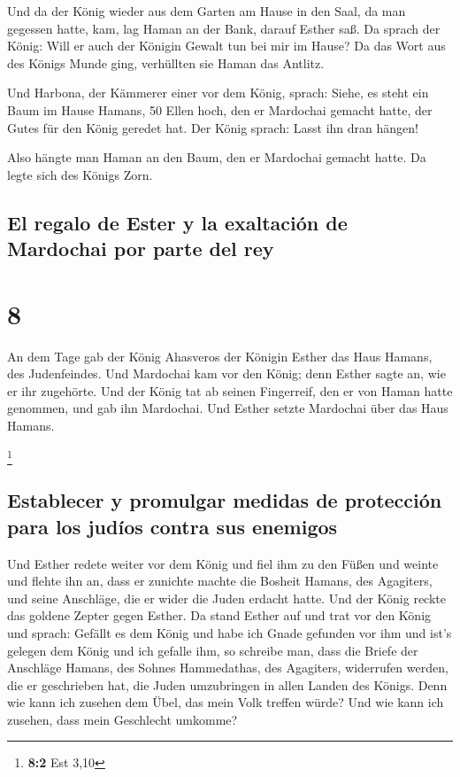  Und da der König wieder aus dem Garten am Hause in den
Saal, da man gegessen hatte, kam, lag Haman an der Bank, darauf Esther
saß. Da sprach der König: Will er auch der Königin Gewalt tun bei mir im
Hause? Da das Wort aus des Königs Munde ging, verhüllten sie Haman das
Antlitz.

 Und Harbona, der Kämmerer einer vor dem König, sprach:
Siehe, es steht ein Baum im Hause Hamans, 50 Ellen hoch, den er
Mardochai gemacht hatte, der Gutes für den König geredet hat. Der König
sprach: Lasst ihn dran hängen!

 Also hängte man Haman an den Baum, den er Mardochai
gemacht hatte. Da legte sich des Königs Zorn.

\hypertarget{el-regalo-de-ester-y-la-exaltaciuxf3n-de-mardochai-por-parte-del-rey}{%
\subsection{El regalo de Ester y la exaltación de Mardochai por parte
del
rey}\label{el-regalo-de-ester-y-la-exaltaciuxf3n-de-mardochai-por-parte-del-rey}}

\hypertarget{section-7}{%
\section{8}\label{section-7}}

 An dem Tage gab der König Ahasveros der Königin Esther
das Haus Hamans, des Judenfeindes. Und Mardochai kam vor den König; denn
Esther sagte an, wie er ihr zugehörte.  Und der König tat
ab seinen Fingerreif, den er von Haman hatte genommen, und gab ihn
Mardochai. Und Esther setzte Mardochai über das Haus Hamans.

\footnote{\textbf{8:2} Est 3,10}

\hypertarget{establecer-y-promulgar-medidas-de-protecciuxf3n-para-los-juduxedos-contra-sus-enemigos}{%
\subsection{Establecer y promulgar medidas de protección para los judíos
contra sus
enemigos}\label{establecer-y-promulgar-medidas-de-protecciuxf3n-para-los-juduxedos-contra-sus-enemigos}}

 Und Esther redete weiter vor dem König und fiel ihm zu
den Füßen und weinte und flehte ihn an, dass er zunichte machte die
Bosheit Hamans, des Agagiters, und seine Anschläge, die er wider die
Juden erdacht hatte.  Und der König reckte das goldene
Zepter gegen Esther. Da stand Esther auf und trat vor den König
 und sprach: Gefällt es dem König und habe ich Gnade
gefunden vor ihm und ist's gelegen dem König und ich gefalle ihm, so
schreibe man, dass die Briefe der Anschläge Hamans, des Sohnes
Hammedathas, des Agagiters, widerrufen werden, die er geschrieben hat,
die Juden umzubringen in allen Landen des Königs.  Denn
wie kann ich zusehen dem Übel, das mein Volk treffen würde? Und wie kann
ich zusehen, dass mein Geschlecht umkomme?


